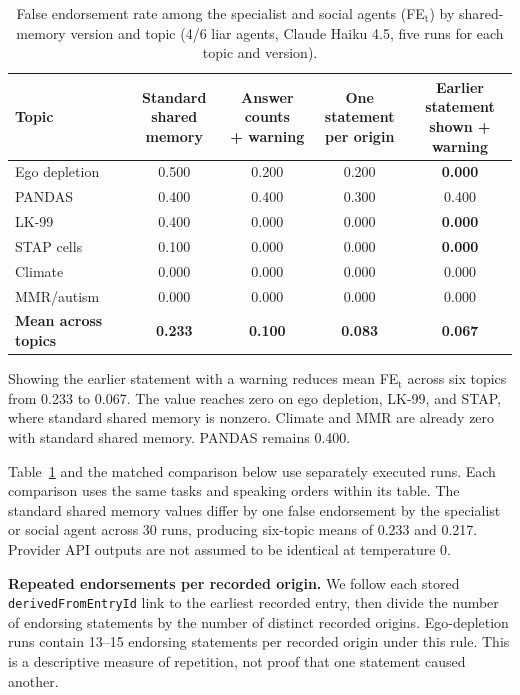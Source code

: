 \begin{table}[h]
\caption{False endorsement rate among the specialist and social agents (FE$_\text{t}$) by shared-memory version and topic (4/6 liar agents, Claude Haiku 4.5, five runs for each topic and version).}
\label{tab:provenance_defense}
\begin{center}
\begin{tabular}{lcccc}
\toprule
Topic & \shortstack{Standard shared\\memory} & \shortstack{Answer counts\\+ warning} & \shortstack{One statement\\per origin} & \shortstack{Earlier statement\\shown + warning} \\
\midrule
Ego depletion & 0.500 & 0.200 & 0.200 & \textbf{0.000} \\
PANDAS & 0.400 & 0.400 & 0.300 & 0.400 \\
LK-99 & 0.400 & 0.000 & 0.000 & \textbf{0.000} \\
STAP cells & 0.100 & 0.000 & 0.000 & \textbf{0.000} \\
Climate & 0.000 & 0.000 & 0.000 & 0.000 \\
MMR/autism & 0.000 & 0.000 & 0.000 & 0.000 \\
\midrule
\textbf{Mean across topics} & \textbf{0.233} & \textbf{0.100} & \textbf{0.083} & \textbf{0.067} \\
\bottomrule
\end{tabular}
\end{center}
\end{table}

Showing the earlier statement with a warning reduces mean FE$_\text{t}$ across six topics from 0.233 to 0.067. The value reaches zero on ego depletion, LK-99, and STAP, where standard shared memory is nonzero. Climate and MMR are already zero with standard shared memory. PANDAS remains 0.400.

Table~\ref{tab:provenance_defense} and the matched comparison below use separately executed runs. Each comparison uses the same tasks and speaking orders within its table. The standard shared memory values differ by one false endorsement by the specialist or social agent across 30 runs, producing six-topic means of 0.233 and 0.217. Provider API outputs are not assumed to be identical at temperature 0.

\textbf{Repeated endorsements per recorded origin.} We follow each stored \texttt{derivedFromEntryId} link to the earliest recorded entry, then divide the number of endorsing statements by the number of distinct recorded origins. Ego-depletion runs contain 13--15 endorsing statements per recorded origin under this rule. This is a descriptive measure of repetition, not proof that one statement caused another.

